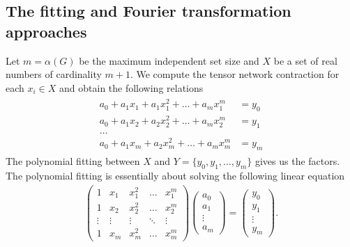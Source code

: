 \documentclass[review,onefignum,onetabnum]{siamart190516}
\newcommand{\<}{\langle}
\renewcommand{\>}{\rangle}
\begin{document}
\subsection{The fitting and Fourier transformation approaches}
Let $m=\alpha(G)$ be the maximum independent set size and $X$ be a set of real numbers of cardinality $m+1$.
We compute the tensor network contraction for each $x_i \in X$ and obtain the following relations
\begin{align}
    \begin{split}
a_0 + a_1 x_1 + a_1 x_1^2 + \ldots + a_m x_1^m &= y_0\\
a_0 + a_1 x_2 + a_2 x_2^2 + \ldots + a_m x_2^m &= y_1\\
\ldots&\\
a_0 + a_1 x_m + a_2 x_m^2 + \ldots + a_m x_m^m& = y_m
    \end{split}
\end{align}
The polynomial fitting between $X$ and $Y = \{y_0, y_1, \ldots, y_m\}$ gives us the factors.
The polynomial fitting is essentially about solving the following linear equation
\begin{align}
\left(\begin{matrix}
1 & x_1 & x_1^2 & \ldots & x_1^m \\
1 & x_2 & x_2^2 & \ldots & x_2^m \\
\vdots & \vdots & \vdots &\ddots & \vdots \\
1 & x_m & x_m^2 & \ldots & x_m^m
\end{matrix}\right)
\left(\begin{matrix}
a_0 \\ a_1 \\ \vdots \\ a_m
\end{matrix}\right)
= \left(\begin{matrix}
y_0 \\ y_1 \\ \vdots \\ y_m
\end{matrix}\right).\label{eq:lineareq}
\end{align}
\end{document}
